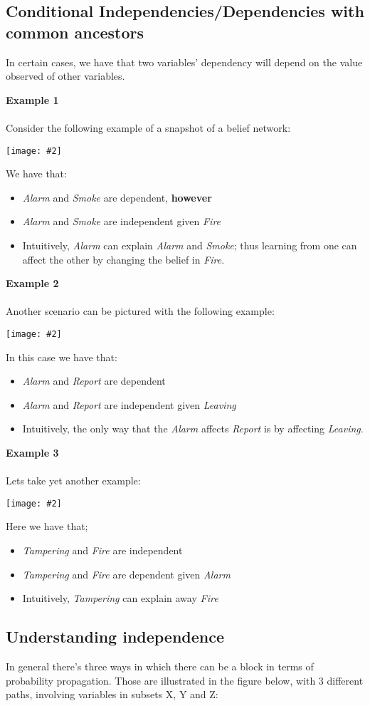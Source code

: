 \documentclass{article}
\newcommand{\centerfig}[2]{\begin{center}\texttt{[image: \#2]}\end{center}}
\begin{document}
\subsection*{Conditional Independencies/Dependencies with common ancestors}
In certain cases, we have that two variables' dependency will depend on the value observed of other variables. \\
\begin{siderules}
\textbf{Example 1}\\
\\
Consider the following example of a snapshot of a belief network:
\centerfig{0.4}{BN-2}
We have that:
\begin{itemize}
	\item \textsl{Alarm} and \textsl{Smoke} are dependent, \textbf{however}
	\item  \textsl{Alarm} and \textsl{Smoke} are independent given \textsl{Fire}
	\item Intuitively, \textsl{Alarm} can explain \textsl{Alarm} and \textsl{Smoke}; thus learning from one can affect the other by changing the belief in \textsl{Fire}.
\end{itemize}
\textbf{Example 2}\\
\\
Another scenario can be pictured with the following example:
\centerfig{0.25}{BN-3}
In this case we have that:
\begin{itemize}
	\item \textsl{Alarm} and \textsl{Report} are dependent
	\item \textsl{Alarm} and \textsl{Report} are independent given \textsl{Leaving}
	\item Intuitively, the only way that the \textsl{Alarm} affects \textsl{Report} is by affecting \textsl{Leaving}.
\end{itemize}
\textbf{Example 3}\\
\\
Lets take yet another example:
\centerfig{0.35}{BN-5}
Here we have that;
\begin{itemize}
	\item \textsl{Tampering} and \textsl{Fire} are independent
	\item \textsl{Tampering} and \textsl{Fire} are dependent given \textsl{Alarm}
	\item Intuitively, \textsl{Tampering} can explain away \textsl{Fire}
\end{itemize}
\end{siderules}
\subsection*{Understanding independence}
In general there's three ways in which there can be a block in terms of probability propagation. Those are illustrated in the figure below, with 3 different paths, involving variables in subsets X, Y and Z:
\end{document}
